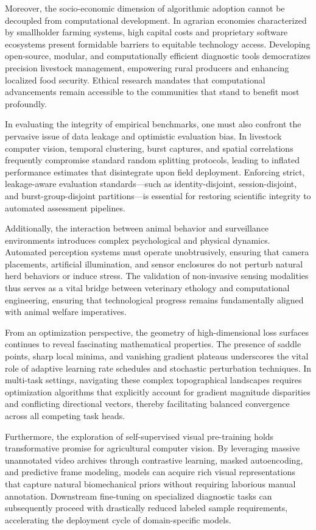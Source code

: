\documentclass[Times,12pt,oneside,openany,print,index]{report}
\begin{document}
Moreover, the socio-economic dimension of algorithmic adoption cannot be decoupled from computational development. In agrarian economies characterized by smallholder farming systems, high capital costs and proprietary software ecosystems present formidable barriers to equitable technology access. Developing open-source, modular, and computationally efficient diagnostic tools democratizes precision livestock management, empowering rural producers and enhancing localized food security. Ethical research mandates that computational advancements remain accessible to the communities that stand to benefit most profoundly.

In evaluating the integrity of empirical benchmarks, one must also confront the pervasive issue of data leakage and optimistic evaluation bias. In livestock computer vision, temporal clustering, burst captures, and spatial correlations frequently compromise standard random splitting protocols, leading to inflated performance estimates that disintegrate upon field deployment. Enforcing strict, leakage-aware evaluation standards—such as identity-disjoint, session-disjoint, and burst-group-disjoint partitions—is essential for restoring scientific integrity to automated assessment pipelines.

Additionally, the interaction between animal behavior and surveillance environments introduces complex psychological and physical dynamics. Automated perception systems must operate unobtrusively, ensuring that camera placements, artificial illumination, and sensor enclosures do not perturb natural herd behaviors or induce stress. The validation of non-invasive sensing modalities thus serves as a vital bridge between veterinary ethology and computational engineering, ensuring that technological progress remains fundamentally aligned with animal welfare imperatives.

From an optimization perspective, the geometry of high-dimensional loss surfaces continues to reveal fascinating mathematical properties. The presence of saddle points, sharp local minima, and vanishing gradient plateaus underscores the vital role of adaptive learning rate schedules and stochastic perturbation techniques. In multi-task settings, navigating these complex topographical landscapes requires optimization algorithms that explicitly account for gradient magnitude disparities and conflicting directional vectors, thereby facilitating balanced convergence across all competing task heads.

Furthermore, the exploration of self-supervised visual pre-training holds transformative promise for agricultural computer vision. By leveraging massive unannotated video archives through contrastive learning, masked autoencoding, and predictive frame modeling, models can acquire rich visual representations that capture natural biomechanical priors without requiring laborious manual annotation. Downstream fine-tuning on specialized diagnostic tasks can subsequently proceed with drastically reduced labeled sample requirements, accelerating the deployment cycle of domain-specific models.
\end{document}
